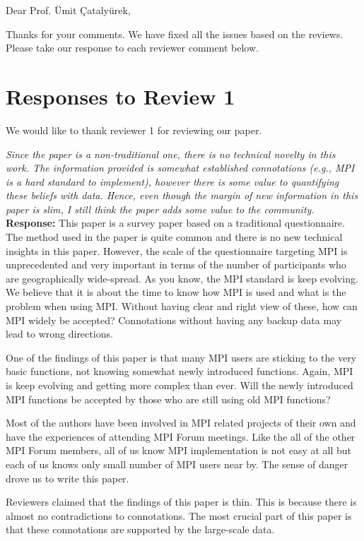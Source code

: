 \documentclass[11pt]{article}
\newcommand{\response}[2]{{\vspace{5mm}\noindent{\bf Comment:} \em #1}\\%
  {\bf Response:} #2}
\begin{document}
\noindent
Dear Prof. \"{U}mit \c{C}ataly\"{u}rek,

\vspace{5mm}

Thanks for your comments. We have fixed all the issues based on the
reviews. Please take our response to each reviewer comment below.

\section*{Responses to Review 1}

We would like to thank reviewer 1 for reviewing our paper.

\response{
  Since the paper is a non-traditional one, there is no technical
  novelty in this work. The information provided is somewhat established
  connotations (e.g., MPI is a hard standard to implement), however
  there is some value to quantifying these beliefs with data. Hence,
  even though the margin of new information in this paper is slim, I
  still think the paper adds some value to the community.}
         {This paper is a survey paper based on a traditional
           questionnaire.  The method used in the paper is quite
           common and there is no new technical insights in this paper.
           However, the scale of the 
           questionnaire targeting MPI is unprecedented and very
           important in terms of
           the number of participants who are geographically
           wide-spread. As you know, the MPI standard is keep
           evolving. We believe that it is about the time to know how
           MPI is used and what is the problem when using MPI. Without
           having clear and right view of these, how can MPI widely be accepted?
           Connotations without having any backup data may lead to
           wrong directions.
           
         One of the findings of this paper is that many MPI users are
         sticking to the very basic functions, not knowing somewhat
         newly introduced functions. Again, MPI is keep evolving and
         getting more complex than ever. Will the newly introduced MPI
         functions be accepted by those who are still using old MPI functions?

         Most of the authors have been
         involved in MPI related projects of their own and have
         the experiences of attending MPI Forum meetings.  Like the
         all of the other MPI Forum members, all of us
         know MPI implementation is not easy at all but
         each of us knows only small number of MPI users near by.
         The sense of danger drove us to write this paper.

         Reviewers claimed that the findings of this paper is
         thin. This is because there is almost no contradictions to
         connotations.  The most crucial part of this paper is that
         these connotations are supported by the large-scale data.}
\end{document}
